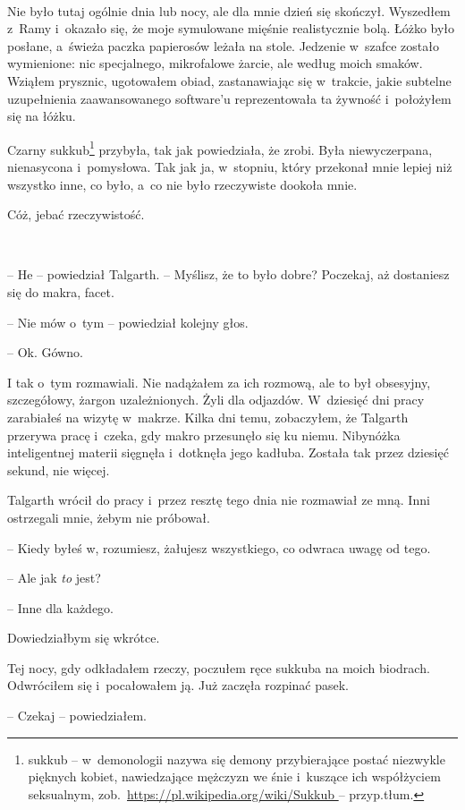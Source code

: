 \documentclass[oneside,polish,11pt,sfheadings]{mwbk}
\begin{document}
~

Nie było tutaj ogólnie dnia lub nocy, ale dla mnie dzień się skończył.
Wyszedłem z~Ramy i~okazało się, że moje symulowane mięśnie realistycznie
bolą. Łóżko było posłane, a~świeża paczka papierosów leżała na stole.
Jedzenie w~szafce zostało wymienione: nic specjalnego, mikrofalowe
żarcie, ale według moich smaków. Wziąłem prysznic, ugotowałem obiad,
zastanawiając się w~trakcie, jakie subtelne uzupełnienia zaawansowanego
software'u reprezentowała ta żywność i~położyłem się na łóżku.

Czarny sukkub\footnote{sukkub -- w~demonologii nazywa się demony przybierające
postać niezwykle pięknych kobiet, nawiedzające mężczyzn we śnie i~kuszące ich współżyciem seksualnym,
zob.~\url{https://pl.wikipedia.org/wiki/Sukkub } -- przyp.tłum.} przybyła, tak jak powiedziała, że zrobi. Była
niewyczerpana, nienasycona i~pomysłowa. Tak jak ja, w~stopniu, który
przekonał mnie lepiej niż wszystko inne, co było, a~co nie było
rzeczywiste dookoła mnie.

Cóż, jebać rzeczywistość.

~

-- He -- powiedział Talgarth. -- Myślisz, że to było dobre? Poczekaj, aż
dostaniesz się do makra, facet.

-- Nie mów o~tym -- powiedział kolejny głos.

-- Ok. Gówno.

I tak o~tym rozmawiali. Nie nadążałem za ich rozmową, ale to był
obsesyjny, szczegółowy, żargon uzależnionych. Żyli dla odjazdów. W~dziesięć dni pracy zarabiałeś na wizytę w~makrze. Kilka dni temu,
zobaczyłem, że Talgarth przerywa pracę i~czeka, gdy makro przesunęło się
ku niemu. Nibynóżka inteligentnej materii sięgnęła i~dotknęła jego
kadłuba. Została tak przez dziesięć sekund, nie więcej.

Talgarth wrócił do pracy i~przez resztę tego dnia nie rozmawiał ze mną.
Inni ostrzegali mnie, żebym nie próbował.

-- Kiedy byłeś w, rozumiesz, żałujesz wszystkiego, co odwraca uwagę od
tego.

-- Ale jak \emph{to} jest?

-- Inne dla każdego.

Dowiedziałbym się wkrótce.

Tej nocy, gdy odkładałem rzeczy, poczułem ręce sukkuba na moich
biodrach. Odwróciłem się i~pocałowałem ją. Już zaczęła rozpinać pasek.

-- Czekaj -- powiedziałem.
\end{document}

